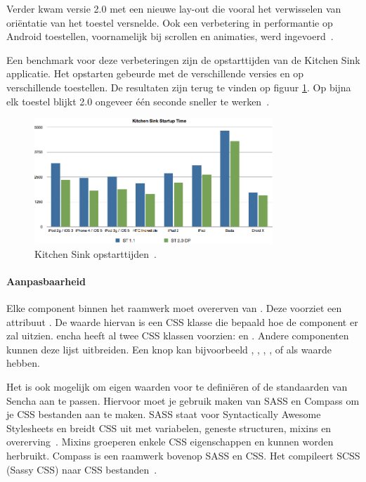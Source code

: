 Verder kwam versie 2.0 met een nieuwe lay-out  die vooral het verwisselen van oriëntatie van het toestel versnelde.  
Ook een verbetering in performantie op Android toestellen,  voornamelijk bij scrollen en animaties,  werd ingevoerd~\cite{Inc.}.

Een benchmark voor deze verbeteringen zijn de opstarttijden van de Kitchen Sink applicatie.  
Het opstarten gebeurde met de verschillende \st{} versies en op verschillende toestellen.  
De resultaten zijn terug te vinden op figuur \ref{fig:sencha_performance}.  
Op bijna elk toestel blijkt \st{} 2.0 ongeveer één seconde sneller te werken~\cite{SenchaInc.2013}.

\begin{figure}
  \centering
  \includegraphics[width=0.8\textwidth]{figuren/sencha-touch-startup-times.png}
  \caption{\st{} Kitchen Sink opstarttijden~\cite{SenchaInc.2013}.}
  \label{fig:sencha_performance}
\end{figure}

\paragraph{Aanpasbaarheid}
\label{sec:sencha-aanpasbaarheid}
Elke component binnen het raamwerk moet overerven van .  
Deze voorziet een attribuut .  De waarde hiervan is een CSS klasse die bepaald hoe de component er zal uitzien.  
encha heeft al twee CSS klassen voorzien:   en .  
Andere componenten kunnen deze lijst uitbreiden.  
Een knop kan bijvoorbeeld ,  ,  ,  ,   of  als  waarde hebben.

Het is ook mogelijk om eigen waarden voor  te definiëren of de standaarden van Sencha aan te passen.  
Hiervoor moet je gebruik maken van SASS en Compass om je CSS bestanden aan te maken.  
SASS staat voor Syntactically Awesome Stylesheets en breidt CSS uit met variabelen,  geneste structuren,  mixins en overerving~\cite{Eppstein2013}.  
Mixins groeperen enkele CSS eigenschappen en kunnen worden herbruikt.  
Compass is een raamwerk bovenop SASS en CSS.  Het compileert SCSS (Sassy CSS) naar CSS bestanden~\cite{Eppstein2013a}.        

